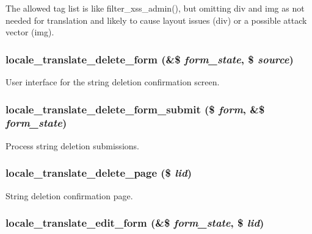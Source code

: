 The allowed tag list is like filter\_\-xss\_\-admin(), but omitting div and img as not needed for translation and likely to cause layout issues (div) or a possible attack vector (img). \hypertarget{group__locale_g2e1074d7d1c8bf96ffa578da3f0e4979}{
\subsubsection[{locale\_\-translate\_\-delete\_\-form}]{\setlength{\rightskip}{0pt plus 5cm}locale\_\-translate\_\-delete\_\-form (\&\$ {\em form\_\-state}, \/  \$ {\em source})}}
\label{group__locale_g2e1074d7d1c8bf96ffa578da3f0e4979}


User interface for the string deletion confirmation screen. \hypertarget{group__locale_g26d7aa049b06d9de384175698f5761c7}{
\subsubsection[{locale\_\-translate\_\-delete\_\-form\_\-submit}]{\setlength{\rightskip}{0pt plus 5cm}locale\_\-translate\_\-delete\_\-form\_\-submit (\$ {\em form}, \/  \&\$ {\em form\_\-state})}}
\label{group__locale_g26d7aa049b06d9de384175698f5761c7}


Process string deletion submissions. \hypertarget{group__locale_gde9664489526c09d68def1897631f4fa}{
\subsubsection[{locale\_\-translate\_\-delete\_\-page}]{\setlength{\rightskip}{0pt plus 5cm}locale\_\-translate\_\-delete\_\-page (\$ {\em lid})}}
\label{group__locale_gde9664489526c09d68def1897631f4fa}


String deletion confirmation page. \hypertarget{group__locale_g08d9a7d27e6a26ca6cd4d9148f2973ce}{
\subsubsection[{locale\_\-translate\_\-edit\_\-form}]{\setlength{\rightskip}{0pt plus 5cm}locale\_\-translate\_\-edit\_\-form (\&\$ {\em form\_\-state}, \/  \$ {\em lid})}}
\label{group__locale_g08d9a7d27e6a26ca6cd4d9148f2973ce}


